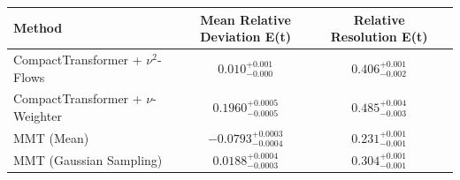    \begin{tabular}{lccc}
        \toprule
        Method & Mean Relative Deviation E(t) & Relative Resolution E(t) \\
        \midrule
        CompactTransformer + $\nu^2$-Flows & $0.010_{-0.000}^{+0.001}$ & $0.406_{-0.002}^{+0.001}$ \\
        CompactTransformer + $\nu$-Weighter & $0.1960_{-0.0005}^{+0.0005}$ & $0.485_{-0.003}^{+0.004}$ \\
        MMT (Mean) & $-0.0793_{-0.0004}^{+0.0003}$ & $0.231_{-0.001}^{+0.001}$ \\
        MMT (Gaussian Sampling) & $0.0188_{-0.0003}^{+0.0004}$ & $0.304_{-0.001}^{+0.001}$ \\
        \bottomrule
    \end{tabular}
